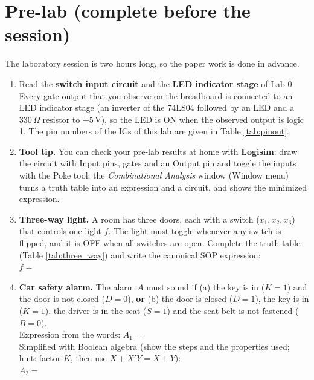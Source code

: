 \documentclass{article}
\begin{document}
\section*{Pre-lab (complete before the session)}
The laboratory session is two hours long, so the paper work is done in advance.
\begin{enumerate}
    \item Read the \textbf{switch input circuit} and the \textbf{LED indicator stage} of Lab 0. Every gate output that you observe on the breadboard is connected to an LED indicator stage (an inverter of the 74LS04 followed by an LED and a $330\,\Omega$ resistor to $+5\,\mathrm{V}$), so the LED is ON when the observed output is logic 1. The pin numbers of the ICs of this lab are given in Table \ref{tab:pinout}.
    \item \textbf{Tool tip.} You can check your pre-lab results at home with \textbf{Logisim}: draw the circuit with Input pins, gates and an Output pin and toggle the inputs with the Poke tool; the \emph{Combinational Analysis} window (Window menu) turns a truth table into an expression and a circuit, and shows the minimized expression.
    \item \textbf{Three-way light.} A room has three doors, each with a switch ($x_1, x_2, x_3$) that controls one light $f$. The light must toggle whenever any switch is flipped, and it is OFF when all switches are open. Complete the truth table (Table \ref{tab:three_way}) and write the canonical SOP expression: \\[0.2cm]
    $f = $ \underline{\hspace{10cm}}
    \item \textbf{Car safety alarm.} The alarm $A$ must sound if (a) the key is in ($K=1$) and the door is not closed ($D=0$), \textbf{or} (b) the door is closed ($D=1$), the key is in ($K=1$), the driver is in the seat ($S=1$) and the seat belt is not fastened ($B=0$). \\[0.2cm]
    Expression from the words: $A_1 = $ \underline{\hspace{7cm}} \\[0.2cm]
    Simplified with Boolean algebra (show the steps and the properties used; hint: factor $K$, then use $X + X'Y = X + Y$): \\[0.2cm]
    $A_2 = $ \underline{\hspace{7cm}}
\end{enumerate}
\end{document}
